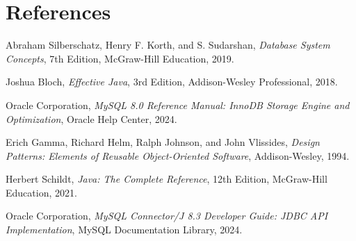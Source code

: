 \documentclass[12pt,a4paper]{article}
\begin{document}
\section{References}
\label{sec:references}

\begin{enumerate}[label={[\arabic*]}, leftmargin=*, noitemsep]
    \item Abraham Silberschatz, Henry F. Korth, and S. Sudarshan, \textit{Database System Concepts}, 7th Edition, McGraw-Hill Education, 2019.
    \item Joshua Bloch, \textit{Effective Java}, 3rd Edition, Addison-Wesley Professional, 2018.
    \item Oracle Corporation, \textit{MySQL 8.0 Reference Manual: InnoDB Storage Engine and Optimization}, Oracle Help Center, 2024.
    \item Erich Gamma, Richard Helm, Ralph Johnson, and John Vlissides, \textit{Design Patterns: Elements of Reusable Object-Oriented Software}, Addison-Wesley, 1994.
    \item Herbert Schildt, \textit{Java: The Complete Reference}, 12th Edition, McGraw-Hill Education, 2021.
    \item Oracle Corporation, \textit{MySQL Connector/J 8.3 Developer Guide: JDBC API Implementation}, MySQL Documentation Library, 2024.
\end{enumerate}
\end{document}
